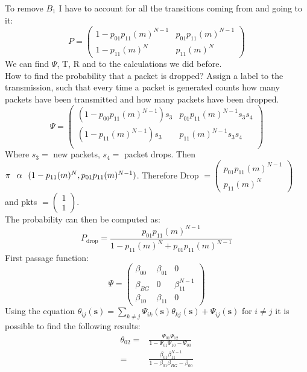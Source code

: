 To remove $B_1$ I have to account for all the transitions coming from and going to it: \\
$$P =
\begin{pmatrix}
		1-p_{01}p_{11}(m)^{N-1} & p_{01}p_{11}(m)^{N-1} \\
		1-p_{11}(m)^N & p_{11}(m)^N
\end{pmatrix}$$
We can find $\Psi$, T, R and to the calculations we did before. \\
How to find the probability that a packet is dropped?
Assign a label to the transmission, such that every time a packet is generated counts how many packets have been transmitted and how many packets have been dropped.
$$\Psi=
\begin{pmatrix}
	 (1- p_{00}p_{11}(m)^{N-1})s_3 & p_{01}p_{11}(m)^{N-1}s_3s_4 \\
	 (1- p_{11}(m)^{N-1})s_3 & p_{11}(m)^{N-1}s_3s_4 \\
\end{pmatrix} $$
Where $s_3 =$ new packets, $s_4 =$ packet drops. Then $\mathbf{\pi} \hspace{0.25cm} \alpha \hspace{0.25cm} (1-p_{11}(m)^N,p_{01}p_{11}(m)^{N-1})$.
Therefore Drop $= \begin{pmatrix} p_{01}p_{11}(m)^{N-1} \\ p_{11}(m)^N \end{pmatrix}$ and pkts $= \begin{pmatrix} 1 \\ 1 \end{pmatrix}$.\\
The probability can then be computed as:
\begin{equation}
	P_{\text{drop}} = \frac{p_{01}p_{11}(m)^{N-1}}{1-p_{11}(m)^N + p_{01}p_{11}(m)^{N-1}}
\end{equation}
First passage function:
$$\Psi=
\begin{pmatrix}
	 \beta_{00} & \beta_{01} & 0 \\
	 \beta_{BG} & 0 & \beta_{11}^{N-1} \\
	 \beta_{10} & \beta_{11} & 0
\end{pmatrix} $$
Using the equation $\theta_{ij}(\textbf{s}) = \sum_{k \neq j} \Psi_{ik}(\textbf{s})\theta_{kj}(\textbf{s}) + \Psi_{ij}(\textbf{s})$ for $i\neq j$ it is possible to find the following results:
\begin{equation*}
	\begin{split}
		\theta_{02} = & \frac{\Psi_{01}\Psi_{12}}{1 - \Psi_{01}\Psi_{10} - \Psi_{00}}\\
		= & \frac{\beta_{01}\beta_{11}^{N-1}}{1- \beta_{01}\beta_{BG}-\beta_{00}}
	\end{split}
\end{equation*}
